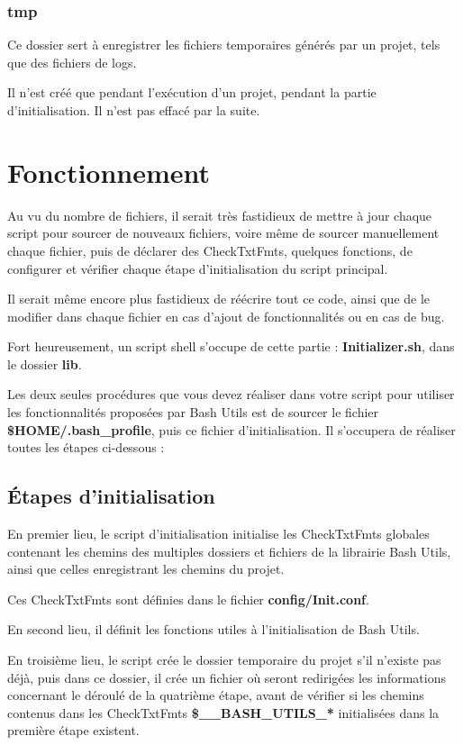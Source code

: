 \documentclass[a4paper,10pt]{article}
\begin{document}
\color{blue}
\subsubsection{tmp}\color{white}
Ce dossier sert à enregistrer les fichiers temporaires générés par un projet, tels que des fichiers de logs.

Il n'est créé que pendant l'exécution d'un projet, pendant la partie d'initialisation. Il n'est pas effacé par la suite.


\color{red}
\section{Fonctionnement}\color{white}
Au vu du nombre de fichiers, il serait très fastidieux de mettre à jour chaque script pour sourcer de nouveaux fichiers, voire même de sourcer manuellement chaque fichier, puis de déclarer des CheckTxtFmts, quelques fonctions, de configurer et vérifier chaque étape d'initialisation du script principal.

Il serait même encore plus fastidieux de réécrire tout ce code, ainsi que de le modifier dans chaque fichier en cas d'ajout de fonctionnalités ou en cas de bug.

Fort heureusement, un script shell s'occupe de cette partie : \color{lime}\textbf{Initializer.sh}\color{white}, dans le dossier \color{lime}\textbf{lib}\color{white}.

Les deux seules procédures que vous devez réaliser dans votre script pour utiliser les fonctionnalités proposées par Bash Utils est de sourcer le fichier \color{orange}\textbf{\$HOME\color{lime}/.bash\_profile}\color{white}, puis ce fichier d'initialisation. Il s'occupera de réaliser toutes les étapes ci-dessous :

\color{green}
\subsection{Étapes d'initialisation}\color{white}
En premier lieu, le script d'initialisation initialise les CheckTxtFmts globales contenant les chemins des multiples dossiers et fichiers de la librairie Bash Utils, ainsi que celles enregistrant les chemins du projet.

Ces CheckTxtFmts sont définies dans le fichier \color{lime}\textbf{config/Init.conf}\color{white}.

En second lieu, il définit les fonctions utiles à l'initialisation de Bash Utils.

En troisième lieu, le script crée le dossier temporaire du projet s'il n'existe pas déjà, puis dans ce dossier, il crée un fichier où seront redirigées les informations concernant le déroulé de la quatrième étape, avant de vérifier si les chemins contenus dans les CheckTxtFmts \color{orange}\textbf{\$\_\_BASH\_UTILS\_*}\color{white} initialisées dans la première étape existent.
\end{document}

